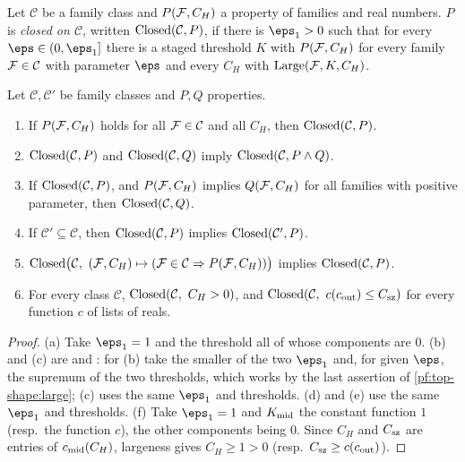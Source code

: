 \begin{definition}\label{pf:top-shape:closed}
Let $\mathcal C$ be a family class and $P(\mathcal{F},C_H)$ a property of families and real numbers.
$P$ is \emph{closed on $\mathcal C$}, written $\mathrm{Closed}(\mathcal C,P)$, if there is $\eps_1>0$ such that
for every $\eps\in(0,\eps_1]$ there is a staged threshold $K$ with $P(\mathcal{F},C_H)$ for every family
$\mathcal{F}\in\mathcal C$ with parameter $\eps$ and every $C_H$ with $\mathrm{Large}(\mathcal{F},K,C_H)$.
\end{definition}

\begin{lemma}\label{pf:top-shape:calculus}
Let $\mathcal C,\mathcal C'$ be family classes and $P,Q$ properties.
\begin{enumerate}[label=(\alph*)]
\item If $P(\mathcal{F},C_H)$ holds for all $\mathcal{F}\in\mathcal C$ and all $C_H$, then
$\mathrm{Closed}(\mathcal C,P)$.
\item $\mathrm{Closed}(\mathcal C,P)$ and $\mathrm{Closed}(\mathcal C,Q)$ imply $\mathrm{Closed}(\mathcal C,P\wedge Q)$.
\item If $\mathrm{Closed}(\mathcal C,P)$, and $P(\mathcal{F},C_H)$ implies $Q(\mathcal{F},C_H)$ for all families
with positive parameter, then $\mathrm{Closed}(\mathcal C,Q)$.
\item If $\mathcal C'\subseteq\mathcal C$, then $\mathrm{Closed}(\mathcal C,P)$ implies $\mathrm{Closed}(\mathcal C',P)$.
\item $\topshapeCl\bigl(\mathcal C,\ (\topshapeF,C_H)\mapsto(\topshapeF\in\mathcal C\Rightarrow
P(\topshapeF,C_H))\bigr)$ implies $\mathrm{Closed}(\mathcal C,P)$.
\item For every class $\mathcal C$, $\mathrm{Closed}(\mathcal C,\ C_H>0)$, and
$\mathrm{Closed}(\mathcal C,\ c(c_{\rm out})\le C_{\rm sz})$ for every function $c$ of lists of reals.
\end{enumerate}
\end{lemma}

\begin{proof}
(a) Take $\eps_1=1$ and the threshold all of whose components are $0$. (b) and (c) are
 and : for (b) take the smaller
of the two $\eps_1$ and, for given $\eps$, the supremum of the two thresholds, which works by the last
assertion of \cref{pf:top-shape:large}; (c) uses the same $\eps_1$ and thresholds. (d) and (e) use the same
$\eps_1$ and thresholds. (f) Take $\eps_1=1$ and $K_{\rm mid}$ the constant function $1$ (resp.\ the function
$c$), the other components being $0$. Since $C_H$ and $C_{\rm sz}$ are entries of $c_{\rm mid}(C_H)$, largeness
gives $C_H\ge1>0$ (resp.\ $C_{\rm sz}\ge c(c_{\rm out})$).
\end{proof}

